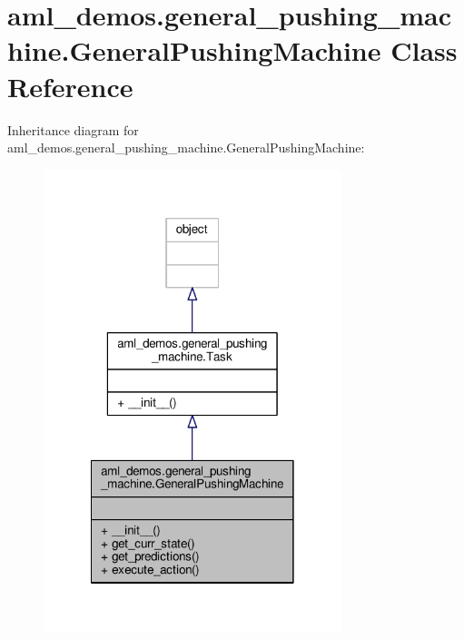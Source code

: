 \hypertarget{classaml__demos_1_1general__pushing__machine_1_1_general_pushing_machine}{\section{aml\-\_\-demos.\-general\-\_\-pushing\-\_\-machine.\-General\-Pushing\-Machine Class Reference}
\label{classaml__demos_1_1general__pushing__machine_1_1_general_pushing_machine}
}


Inheritance diagram for aml\-\_\-demos.\-general\-\_\-pushing\-\_\-machine.\-General\-Pushing\-Machine\-:
\nopagebreak
\begin{figure}[H]
\begin{center}
\leavevmode
\includegraphics[width=246pt]{classaml__demos_1_1general__pushing__machine_1_1_general_pushing_machine__inherit__graph}
\end{center}
\end{figure}


